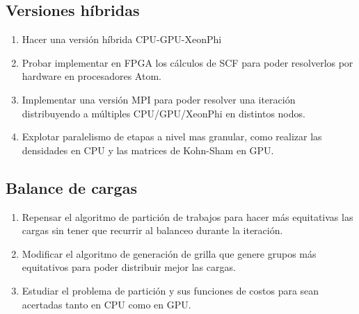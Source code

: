 \subsection*{Versiones h\'ibridas}
\begin{enumerate}
 \item Hacer una versi\'on h\'ibrida CPU-GPU-XeonPhi
  \item Probar implementar en FPGA los c\'alculos de SCF para poder resolverlos por hardware en procesadores
    Atom.
  \item Implementar una versi\'on MPI para poder resolver una iteraci\'on distribuyendo
    a m\'ultiples CPU/GPU/XeonPhi en distintos nodos.
  \item Explotar paralelismo de etapas a nivel mas granular, como realizar las densidades en CPU y las matrices
    de Kohn-Sham en GPU.
\end{enumerate}

\subsection*{Balance de cargas}
\begin{enumerate}
  \item Repensar el algoritmo de partici\'on de trabajos para hacer m\'as equitativas las cargas sin
    tener que recurrir al balanceo durante la iteraci\'on.
  \item Modificar el algoritmo de generaci\'on de grilla que genere grupos m\'as equitativos para poder
    distribuir mejor las cargas.
  \item Estudiar el problema de partici\'on y sus funciones de costos para sean acertadas tanto en CPU
    como en GPU.
\end{enumerate}

